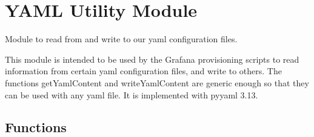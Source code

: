 \documentclass[letterpaper,10pt,english]{sphinxmanual}
\begin{document}
\chapter{YAML Utility Module}
\label{\detokenize{yamlUtility:module-yamlUtility}}\label{\detokenize{yamlUtility:yaml-utility-module}}\label{\detokenize{yamlUtility::doc}}
Module to read from and write to our yaml configuration files.

This module is intended to be used by the Grafana provisioning scripts to read
information from certain yaml configuration files, and write to others. The 
functions getYamlContent and writeYamlContent are generic enough so that they 
can be used with any yaml file. It is implemented with pyyaml 3.13.


\section{Functions}
\label{\detokenize{yamlUtility:functions}}
\end{document}

